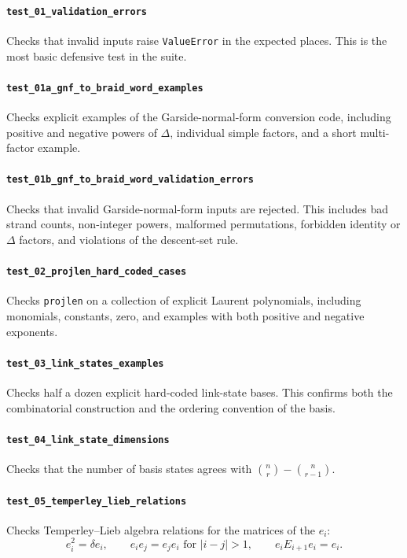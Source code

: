 ﻿\documentclass[10pt]{article}
\begin{document}
\newpage
\paragraph{\texttt{test\_01\_validation\_errors}}
Checks that invalid inputs raise \texttt{ValueError} in the expected places.
This is the most basic defensive test in the suite.

\paragraph{\texttt{test\_01a\_gnf\_to\_braid\_word\_examples}}
Checks explicit examples of the Garside-normal-form conversion code, including positive and negative powers of \(\Delta\), individual simple factors, and a short multi-factor example.

\paragraph{\texttt{test\_01b\_gnf\_to\_braid\_word\_validation\_errors}}
Checks that invalid Garside-normal-form inputs are rejected.
This includes bad strand counts, non-integer powers, malformed permutations, forbidden identity or \(\Delta\) factors, and violations of the descent-set rule.

\paragraph{\texttt{test\_02\_projlen\_hard\_coded\_cases}}
Checks \texttt{projlen} on a collection of explicit Laurent polynomials, including monomials, constants, zero, and examples with both positive and negative exponents.

\paragraph{\texttt{test\_03\_link\_states\_examples}}
Checks half a dozen explicit hard-coded link-state bases.
This confirms both the combinatorial construction and the ordering convention of the basis.

\paragraph{\texttt{test\_04\_link\_state\_dimensions}}
Checks that the number of basis states agrees with $\binom{n}{r} - \binom{n}{r-1}$.

\paragraph{\texttt{test\_05\_temperley\_lieb\_relations}}
Checks Temperley--Lieb algebra relations for the matrices of the \(e_i\):
\[
e_i^2 = \delta e_i,\qquad
e_ie_j = e_je_i \text{ for } |i-j|>1,\qquad
e_iE_{i+1}e_i = e_i.
\]
\end{document}
